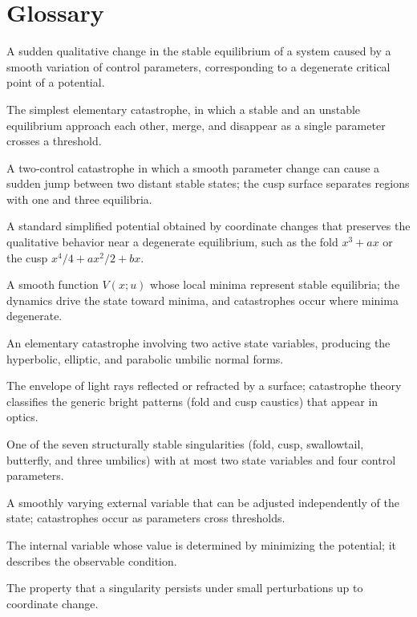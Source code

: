 \section*{Glossary}
\begin{description}[leftmargin=*,style=nextline,itemsep=0.3em]

\item[\textbf{Catastrophe.}] A sudden qualitative change in the stable equilibrium of a system caused by a smooth variation of control parameters, corresponding to a degenerate critical point of a potential.

\item[\textbf{Fold.}] The simplest elementary catastrophe, in which a stable and an unstable equilibrium approach each other, merge, and disappear as a single parameter crosses a threshold.

\item[\textbf{Cusp.}] A two-control catastrophe in which a smooth parameter change can cause a sudden jump between two distant stable states; the cusp surface separates regions with one and three equilibria.

\item[\textbf{Normal form.}] A standard simplified potential obtained by coordinate changes that preserves the qualitative behavior near a degenerate equilibrium, such as the fold $x^3+ax$ or the cusp $x^4/4+ax^2/2+bx$.

\item[\textbf{Potential.}] A smooth function $V(x;u)$ whose local minima represent stable equilibria; the dynamics drive the state toward minima, and catastrophes occur where minima degenerate.

\item[\textbf{Umbilic catastrophe.}] An elementary catastrophe involving two active state variables, producing the hyperbolic, elliptic, and parabolic umbilic normal forms.

\item[\textbf{Caustic.}] The envelope of light rays reflected or refracted by a surface; catastrophe theory classifies the generic bright patterns (fold and cusp caustics) that appear in optics.

\item[\textbf{Elementary catastrophe.}] One of the seven structurally stable singularities (fold, cusp, swallowtail, butterfly, and three umbilics) with at most two state variables and four control parameters.

\item[\textbf{Control parameter.}] A smoothly varying external variable that can be adjusted independently of the state; catastrophes occur as parameters cross thresholds.

\item[\textbf{State variable.}] The internal variable whose value is determined by minimizing the potential; it describes the observable condition.

\item[\textbf{Structural stability.}] The property that a singularity persists under small perturbations up to coordinate change.

\end{description}

